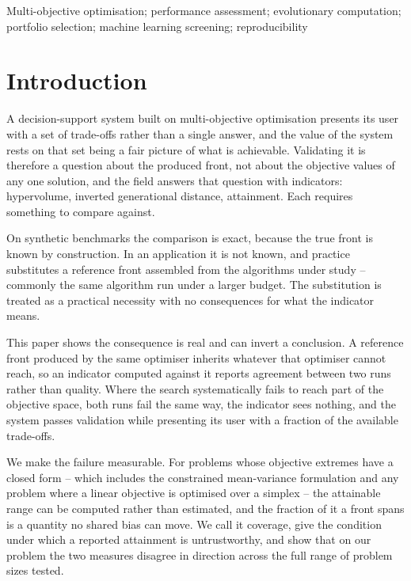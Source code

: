 \documentclass[preprint,11pt,authoryear]{elsarticle}
\begin{document}
\begin{frontmatter}
\begin{keyword}
Multi-objective optimisation; performance assessment; evolutionary computation; portfolio selection; machine learning screening; reproducibility
\end{keyword}

\end{frontmatter}

\section{Introduction}\label{sec:introduction}

A decision-support system built on multi-objective optimisation presents its user with a set of trade-offs rather than a single answer, and the value of the system rests on that set being a fair picture of what is achievable. Validating it is therefore a question about the produced front, not about the objective values of any one solution, and the field answers that question with indicators: hypervolume, inverted generational distance, attainment. Each requires something to compare against.

On synthetic benchmarks the comparison is exact, because the true front is known by construction. In an application it is not known, and practice substitutes a reference front assembled from the algorithms under study -- commonly the same algorithm run under a larger budget. The substitution is treated as a practical necessity with no consequences for what the indicator means.

This paper shows the consequence is real and can invert a conclusion. A reference front produced by the same optimiser inherits whatever that optimiser cannot reach, so an indicator computed against it reports agreement between two runs rather than quality. Where the search systematically fails to reach part of the objective space, both runs fail the same way, the indicator sees nothing, and the system passes validation while presenting its user with a fraction of the available trade-offs.

We make the failure measurable. For problems whose objective extremes have a closed form -- which includes the constrained mean-variance formulation and any problem where a linear objective is optimised over a simplex -- the attainable range can be computed rather than estimated, and the fraction of it a front spans is a quantity no shared bias can move. We call it coverage, give the condition under which a reported attainment is untrustworthy, and show that on our problem the two measures disagree in direction across the full range of problem sizes tested.
\end{document}
